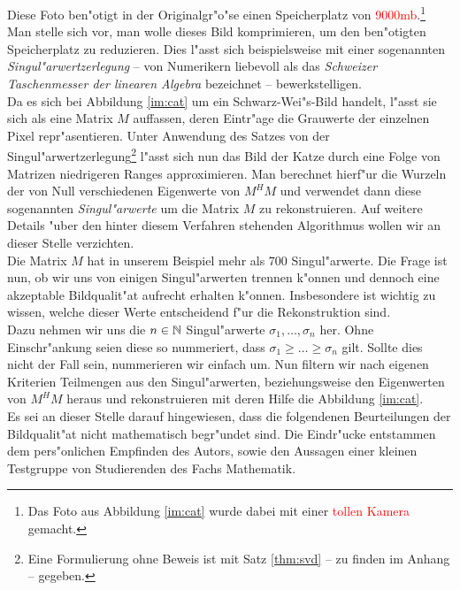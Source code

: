 Diese Foto ben"otigt in der Originalgr"o"se einen Speicherplatz von \textcolor{red}{9000mb}.\footnote{Das Foto aus Abbildung \ref{im:cat} wurde dabei mit einer \textcolor{red}{tollen Kamera} gemacht.}
Man stelle sich vor, man wolle dieses Bild komprimieren, um den ben"otigten Speicherplatz zu reduzieren.
Dies l"asst sich beispielsweise mit einer sogenannten \emph{Singul"arwertzerlegung} -- von Numerikern liebevoll als das \emph{Schweizer Taschenmesser der linearen Algebra} bezeichnet -- bewerkstelligen.\\

Da es sich bei Abbildung \ref{im:cat} um ein Schwarz-Wei"s-Bild handelt, l"asst sie sich als eine Matrix $M$ auffassen, deren Eintr"age die Grauwerte der einzelnen Pixel repr"asentieren.
Unter Anwendung des Satzes von der Singul"arwertzerlegung\footnote{Eine Formulierung ohne Beweis ist mit Satz \ref{thm:svd} -- zu finden im Anhang -- gegeben.} l"asst sich nun das Bild der Katze durch eine Folge von Matrizen niedrigeren Ranges approximieren.
Man berechnet hierf"ur die Wurzeln der von Null verschiedenen Eigenwerte von $M^H M$ und verwendet dann diese sogenannten \emph{Singul"arwerte} um die Matrix $M$ zu rekonstruieren.
Auf weitere Details "uber den hinter diesem Verfahren stehenden Algorithmus wollen wir an dieser Stelle verzichten.\\

Die Matrix $M$ hat in unserem Beispiel mehr als 700 Singul"arwerte. Die Frage ist nun, ob wir uns von einigen Singul"arwerten trennen k"onnen und dennoch eine akzeptable Bildqualit"at aufrecht erhalten k"onnen.
Insbesondere ist wichtig zu wissen, welche dieser Werte entscheidend f"ur die Rekonstruktion sind.\\

Dazu nehmen wir uns die $n\in\mathbb{N}$ Singul"arwerte $\sigma_1,\ldots,\sigma_n$ her. Ohne Einschr"ankung seien diese so nummeriert, dass $\sigma_1 \ge \ldots \ge \sigma_n$ gilt. Sollte dies nicht der Fall sein, nummerieren wir einfach um.
Nun filtern wir nach eigenen Kriterien Teilmengen aus den Singul"arwerten, beziehungsweise den Eigenwerten von $M^H M$ heraus und rekonstruieren mit deren Hilfe die Abbildung \ref{im:cat}.\\

Es sei an dieser Stelle darauf hingewiesen, dass die folgendenen Beurteilungen der Bildqualit"at nicht mathematisch begr"undet sind.
Die Eindr"ucke entstammen dem pers"onlichen Empfinden des Autors, sowie den Aussagen einer kleinen Testgruppe von Studierenden des Fachs Mathematik.\\

